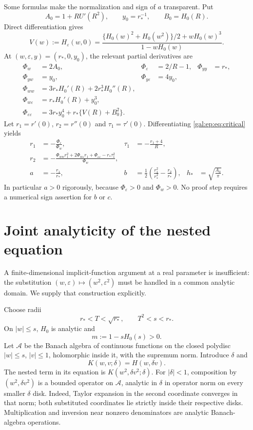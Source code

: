 \documentclass[11pt,letterpaper]{article}
\numberwithin{equation}{section}
\theoremstyle{definition}\newtheorem{definition}[theorem]{Definition}
\theoremstyle{remark}\newtheorem{remark}[theorem]{Remark}
\newcommand{\eps}{\varepsilon}
\begin{document}
Some formulas make the normalization and sign of $a$ transparent. Put
\[
A_0=1+R U'(R^2),\qquad y_0=r_*^{-1},\qquad B_0=H_0(R).
\]
Direct differentiation gives
\begin{equation}\label{gal:ep:eq:V}
V(w):=H_\eps(w,0)
=\frac{\{H_0(w)^2+H_0(w^2)\}/2+wH_0(w)^3}{1-wH_0(w)}.
\end{equation}
At $(w,\eps,y)=(r_*,0,y_0)$, the relevant partial derivatives are
\begin{align}\label{gal:ep:eq:partials}
\Phi_w&=2A_0,&\Phi_\eps&=2/R-1,&\Phi_{yy}&=r_*,\\
\Phi_{yw}&=y_0,&\Phi_{y\eps}&=4y_0,\nonumber\\
\Phi_{ww}&=3r_*H_0'(R)+2r_*^3H_0''(R),\nonumber\\
\Phi_{w\eps}&=r_*H_0'(R)+y_0^3,\nonumber\\
\Phi_{\eps\eps}&=3r_*y_0^4+r_*\{V(R)+B_0^2\}.\nonumber
\end{align}
Let $r_1=r'(0)$, $r_2=r''(0)$ and $\tau_1=\tau'(0)$. Differentiating \eqref{gal:ep:eq:critical} yields
\begin{align}\label{gal:ep:eq:derivatives}
r_1&=-\frac{\Phi_\eps}{\Phi_w},&
\tau_1&=-\frac{r_1+4}{R},\\
r_2&=-\frac{\Phi_{ww}r_1^2+2\Phi_{w\eps}r_1+\Phi_{\eps\eps}-r_*\tau_1^2}{\Phi_w},\nonumber\\
a&=-\frac{r_1}{r_*},&
b&=\frac12\left(\frac{r_1^2}{r_*^2}-\frac{r_2}{r_*}\right),&
h_*&=\sqrt{\frac{A_0}{\pi}}.\nonumber
\end{align}
In particular $a>0$ rigorously, because $\Phi_\eps>0$ and $\Phi_w>0$. No proof step requires a numerical sign assertion for $b$ or $c$.

\section{Joint analyticity of the nested equation}\label{gal:ep:sec:analytic}
A finite-dimensional implicit-function argument at a real parameter is insufficient: the substitution $(w,\eps)\mapsto(w^2,\eps^2)$ must be handled in a common analytic domain. We supply that construction explicitly.

Choose radii
\[
r_*<T<\sqrt{r_*},\qquad T^2<s<r_*.
\]
On $|w|\le s$, $H_0$ is analytic and
\[
m:=1-sH_0(s)>0.
\]
Let $\mathcal A$ be the Banach algebra of continuous functions on the closed polydisc $|w|\le s$, $|v|\le1$, holomorphic inside it, with the supremum norm. Introduce $\delta$ and
\[
K(w,v;\delta)=H(w,\delta v).
\]
The nested term in its equation is $K(w^2,\delta v^2;\delta)$. For $|\delta|<1$, composition by $(w^2,\delta v^2)$ is a bounded operator on $\mathcal A$, analytic in $\delta$ in operator norm on every smaller $\delta$ disk. Indeed, Taylor expansion in the second coordinate converges in that norm; both substituted coordinates lie strictly inside their respective disks. Multiplication and inversion near nonzero denominators are analytic Banach-algebra operations.
\end{document}
